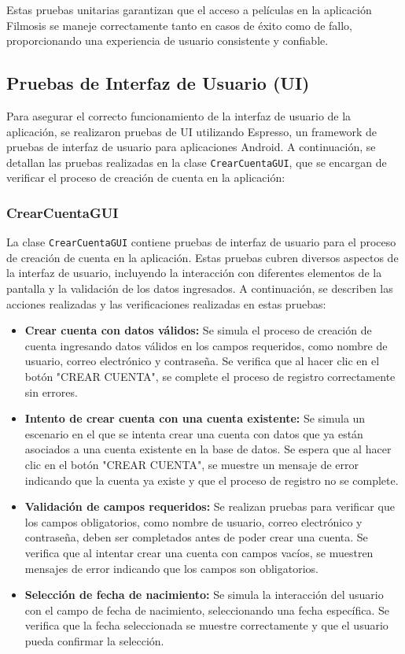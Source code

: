 \documentclass{article}
\begin{document}
Estas pruebas unitarias garantizan que el acceso a películas en la aplicación Filmosis se maneje correctamente tanto en casos de éxito como de fallo, proporcionando una experiencia de usuario consistente y confiable.

\subsection{Pruebas de Interfaz de Usuario (UI)}

Para asegurar el correcto funcionamiento de la interfaz de usuario de la aplicación, se realizaron pruebas de UI utilizando Espresso, un framework de pruebas de interfaz de usuario para aplicaciones Android. A continuación, se detallan las pruebas realizadas en la clase \texttt{CrearCuentaGUI}, que se encargan de verificar el proceso de creación de cuenta en la aplicación:

\subsubsection{CrearCuentaGUI}

La clase \texttt{CrearCuentaGUI} contiene pruebas de interfaz de usuario para el proceso de creación de cuenta en la aplicación. Estas pruebas cubren diversos aspectos de la interfaz de usuario, incluyendo la interacción con diferentes elementos de la pantalla y la validación de los datos ingresados. A continuación, se describen las acciones realizadas y las verificaciones realizadas en estas pruebas:

\begin{itemize}
    \item \textbf{Crear cuenta con datos válidos:} Se simula el proceso de creación de cuenta ingresando datos válidos en los campos requeridos, como nombre de usuario, correo electrónico y contraseña. Se verifica que al hacer clic en el botón "CREAR CUENTA", se complete el proceso de registro correctamente sin errores.
    
    \item \textbf{Intento de crear cuenta con una cuenta existente:} Se simula un escenario en el que se intenta crear una cuenta con datos que ya están asociados a una cuenta existente en la base de datos. Se espera que al hacer clic en el botón "CREAR CUENTA", se muestre un mensaje de error indicando que la cuenta ya existe y que el proceso de registro no se complete.
    
    \item \textbf{Validación de campos requeridos:} Se realizan pruebas para verificar que los campos obligatorios, como nombre de usuario, correo electrónico y contraseña, deben ser completados antes de poder crear una cuenta. Se verifica que al intentar crear una cuenta con campos vacíos, se muestren mensajes de error indicando que los campos son obligatorios.
    
    \item \textbf{Selección de fecha de nacimiento:} Se simula la interacción del usuario con el campo de fecha de nacimiento, seleccionando una fecha específica. Se verifica que la fecha seleccionada se muestre correctamente y que el usuario pueda confirmar la selección.
\end{itemize}
\end{document}
